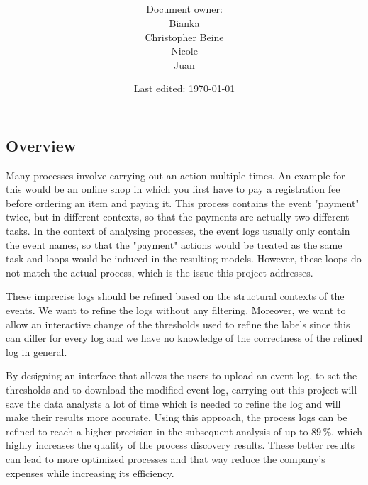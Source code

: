 \documentclass[notitlepage]{article}
\title{%
	\documentName\text{ } \\
  \large \projectName\text{ } \\
  }
\author{
	\large Document owner:\\
	Bianka\\
	\texttt{}
	Christopher Beine\\
	\texttt{}
	Nicole\\
	\texttt{}
	Juan\\
	\texttt{}
}
\date{\small{Last edited: \today}}
\begin{document}
\begin{titlepage}
\clearpage\maketitle			%
\thispagestyle{fancy}
\tableofcontents
\end{titlepage}

\rfoot{\thepage}				%


\begin{flushleft}				%

\section{Overview}
Many processes involve carrying out an action multiple times. An example for this would be an online shop in which you first have to pay a registration fee before ordering an item and paying it. This process contains the event "payment" twice, but in different contexts, so that the payments are actually two different tasks. In the context of analysing processes, the event logs usually only contain the event names, so that the "payment" actions would be treated as the same task and loops would be induced in the resulting models. However, these loops do not match the actual process, which is the issue this project addresses. 

These imprecise logs should be refined based on the structural contexts of the events. We want to refine the logs without any filtering. Moreover, we want to allow an interactive change of the thresholds used to refine the labels since this can differ for every log and we have no knowledge of the correctness of the refined log in general.

By designing an interface that allows the users to upload an event log, to set the thresholds and to download the modified event log, carrying out this project will save the data analysts a lot of time which is needed to refine the log and will make their results more accurate.  Using this approach, the process logs can be refined to reach a higher precision in the subsequent analysis of up to $89 \, \% $, which highly increases the quality of the process discovery results. These better results can lead to more optimized processes and that way reduce the company's expenses while increasing its efficiency. 



\end{flushleft}
\end{document}

